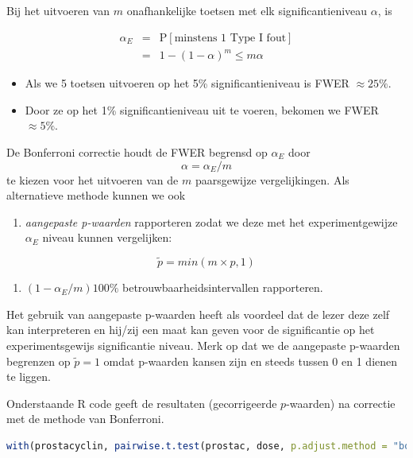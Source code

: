 \documentclass[
  12pt,dutch,coursenotes]{book}
\providecommand{\tightlist}{%
  \setlength{\itemsep}{0pt}\setlength{\parskip}{0pt}}
\begin{document}
Bij het uitvoeren van \(m\) onafhankelijke toetsen met elk significantieniveau \(\alpha\), is

\begin{eqnarray*}
\alpha_E&=&\text{P}[\text{minstens 1 Type I fout}]\\
&=&1-(1-\alpha)^m \leq m\alpha
\end{eqnarray*}

\begin{itemize}
\tightlist
\item
  Als we 5 toetsen uitvoeren op het 5\% significantieniveau is FWER \(\approx 25\%\).
\item
  Door ze op het 1\% significantieniveau uit te voeren, bekomen we FWER \(\approx 5\%\).
\end{itemize}

De Bonferroni correctie houdt de FWER begrensd op \(\alpha_E\) door \[\alpha=\alpha_E/m\] te kiezen voor het uitvoeren van de \(m\) paarsgewijze vergelijkingen.
Als alternatieve methode kunnen we ook

\begin{enumerate}
\def\labelenumi{\arabic{enumi}.}
\tightlist
\item
  \emph{aangepaste p-waarden} rapporteren zodat we deze met het experimentgewijze \(\alpha_E\) niveau kunnen vergelijken:
\end{enumerate}

\[\tilde{p}=min(m\times p,1)\]

\begin{enumerate}
\def\labelenumi{\arabic{enumi}.}
\setcounter{enumi}{1}
\tightlist
\item
  \((1-\alpha_E/m)100\%\) betrouwbaarheidsintervallen rapporteren.
\end{enumerate}

Het gebruik van aangepaste p-waarden heeft als voordeel dat de lezer deze zelf kan interpreteren en hij/zij een maat kan geven voor de significantie op het experimentsgewijs significantie niveau.
Merk op dat we de aangepaste p-waarden begrenzen op \(\tilde{p}=1\) omdat p-waarden kansen zijn en steeds tussen 0 en 1 dienen te liggen.

Onderstaande R code geeft de resultaten (gecorrigeerde \(p\)-waarden) na correctie met de methode van Bonferroni.

\begin{lstlisting}[language=R]
with(prostacyclin, pairwise.t.test(prostac, dose, p.adjust.method = "bonferroni"))
\end{lstlisting}
\end{document}
